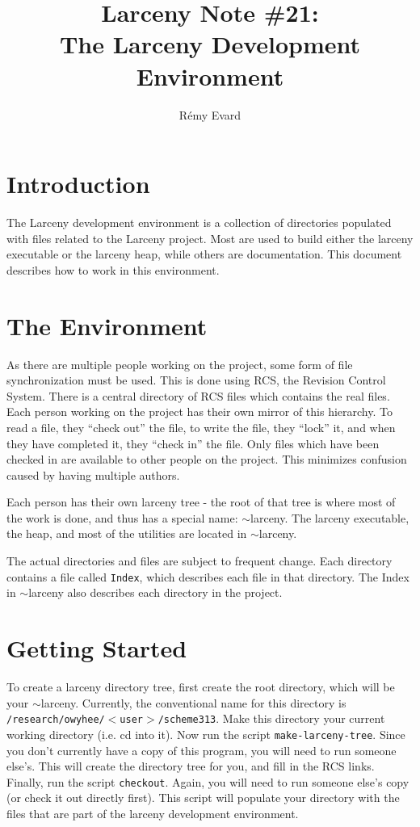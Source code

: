 
\title{Larceny Note \#21: \\
       The Larceny Development Environment}
\author{R\'{e}my Evard}


\maketitle

\section{Introduction}

The Larceny development environment is a collection of directories
populated with files related to the Larceny project.  Most are used
to build either the larceny executable or the larceny heap, while others
are documentation.  This document describes how to work in this
environment.

\section{The Environment}

As there are multiple people working on the project, some form of file
synchronization must be used.  This is done using 
RCS, the Revision Control System. There is a central directory of RCS files 
which contains the real files.
Each person working on the project has their own mirror of this hierarchy.
To read a file, they ``check out'' the file, to write the file, they ``lock''
it, and when they have completed it, they ``check in'' the file.  Only
files which have been checked in are available to other people on the
project. This minimizes confusion caused by having multiple authors.

Each person has their own larceny tree - the root of that tree is where
most of the work is done, and thus has a special name: $\sim$larceny.
The larceny executable, the heap, and most of the utilities are located
in $\sim$larceny.

The actual directories and files are subject to frequent change.
Each directory contains a file called {\tt Index}, which describes 
each file in that directory.  The Index in $\sim$larceny also
describes each directory in the project.

\section{Getting Started}

To create a larceny directory tree, first create the root directory,
which will be your $\sim$larceny.  Currently, the conventional name
for this directory is {\tt /research/owyhee/$<$user$>$/scheme313}.
Make this directory your current working directory (i.e. cd into it).
Now run the script {\tt make-larceny-tree}.  Since you don't currently
have a copy of this program, you will need to run someone else's.  
This will create the directory tree for you, and fill in the RCS links.
Finally, run the script {\tt checkout}.  Again, you will need
to run someone else's copy (or check it out directly first).  This
script will populate your directory with the files that are part of
the larceny development environment.

